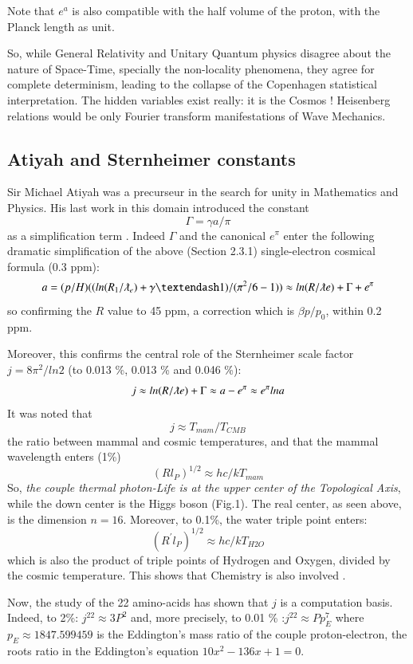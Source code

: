 \documentclass[twoside,draft]{article}
\begin{document}
\begin{sloppypar}
{Note that $e^{a}$ is also compatible with the half volume of the proton, with
the Planck length as unit.

So, while General Relativity and Unitary Quantum physics disagree about the nature of Space-Time, specially the non-locality phenomena, they agree for complete determinism, leading to the collapse of the
Copenhagen statistical interpretation. The hidden variables exist really: it is the Cosmos ! Heisenberg
relations would be only Fourier transform manifestations of Wave Mechanics.


\subsection{Atiyah and Sternheimer constants}
    Sir Michael Atiyah was a precurseur in the search for unity in Mathematics and Physics. His last work in this domain introduced the constant $$\Gamma = \gamma a /\pi$$ as a simplification term \cite{Atiyah1}. Indeed $\Gamma$ and the canonical $e^{\pi}$ enter the following dramatic simplification of the above (Section 2.3.1) single-electron cosmical formula (0.3 ppm):    
\begin{equation}
a = (p/H)((ln(R_1/\lambdabar_e) + \gamma – 1)/(\pi^2/6 - 1)) \approx ln(R/\lambdabar e) + \Gamma + e^{\pi}
\end{equation}
so confirming the $R$ value to 45 ppm, a correction which is $\beta p/p_0$, within 0.2 ppm.

Moreover, this confirms the central role of the Sternheimer scale factor $j = 8\pi^2/ln2$ (to 0.013 \%, 0.013 \% and 0.046 \%):
\begin{equation}
j \approx ln(R/\lambdabar e) + \Gamma \approx a - e^{\pi} \approx e^{\pi} lna
\end{equation}
It was noted \cite{Sanchez1} that $$j\approx T_{mam}/T_{CMB}$$ the ratio between mammal and cosmic temperatures, and that the mammal wavelength enters (1\%) $$(Rl_P)^{1/2}\approx hc/kT_{mam}$$ So, \textit{the couple thermal photon-Life is at the upper center of the Topological Axis}, while the down center is the Higgs boson (Fig.1). The real center, as seen above, is the dimension $n = 16$. Moreover, to 0.1\%, the water triple point enters: $$(R^{\prime}l_P)^{1/2}\approx hc/kT_{H2O}$$ which is also the product of triple points of Hydrogen and Oxygen, divided by the cosmic temperature. This shows that Chemistry is also involved \cite{Sanchez1}.

Now, the study of the 22 amino-acids \cite{Sanchez1} has shown that $j$ is a computation basis. Indeed, to 2\%: $j^{22} \approx 3 P^2 $ and, more precisely, to 0.01 \% :$j^{22} \approx Pp_E^7 $ where $ p_E \approx 1847.599459$ is the Eddington's mass ratio of the couple proton-electron, the roots ratio in the Eddington's equation $10x^2 - 136x + 1 = 0 $.

}
\end{sloppypar}
\end{document}
